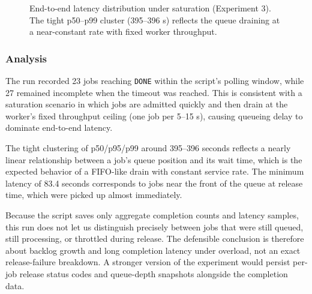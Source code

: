 \documentclass[11pt,letterpaper]{article}
\begin{document}
\begin{figure}[H]
\centering
{}
\caption{End-to-end latency distribution under saturation (Experiment 3). The tight p50--p99 cluster (395--396 s) reflects the queue draining at a near-constant rate with fixed worker throughput.}
\end{figure}

\subsubsection{Analysis}

\begin{resultbox}
The run recorded 23 jobs reaching \texttt{DONE} within the script's polling window, while 27 remained incomplete when the timeout was reached. This is consistent with a saturation scenario in which jobs are admitted quickly and then drain at the worker's fixed throughput ceiling (one job per 5--15 s), causing queueing delay to dominate end-to-end latency.

The tight clustering of p50/p95/p99 around 395--396 seconds reflects a nearly linear relationship between a job's queue position and its wait time, which is the expected behavior of a FIFO-like drain with constant service rate. The minimum latency of 83.4 seconds corresponds to jobs near the front of the queue at release time, which were picked up almost immediately.

Because the script saves only aggregate completion counts and latency samples, this run does not let us distinguish precisely between jobs that were still queued, still processing, or throttled during release. The defensible conclusion is therefore about backlog growth and long completion latency under overload, not an exact release-failure breakdown. A stronger version of the experiment would persist per-job release status codes and queue-depth snapshots alongside the completion data.
\end{resultbox}
\end{document}
